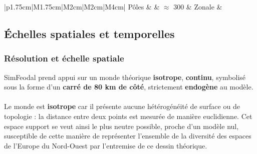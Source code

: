 \begin{table}[H]
{\begin{tabular}{|p{1.75cm}|M{1.75cm}|M{2cm}|M{2cm}|M{4cm}|}
		Pôles &  & $\approx$ 300 & Zonale &  \\ \hline
		\end{tabular}}
	\caption{Les différents types d'agents de SimFeodal.\\
	$\upalpha$ : Il s'agit ici d'ordres de grandeur (les nombres pouvant varier fortement en fonction des simulations) du nombre d'agents de chaque type en fin de simulation.\\
	$\upbeta$ : Les agents sans emprise spatiale (---) ne sont pas localisés dans l'espace du modèle.\\
	$\upgamma$ : Les agents sans comportement actifs (---) n'agissent pas en tant que tel, mais peuvent servir de support pour les actions d'autres agents.}
	\label{tab:agents-simfeodal}
		\end{table}

\subsection{Échelles spatiales et temporelles}

\subsubsection{Résolution et échelle spatiale \label{subsec:reso-spatiale}}

SimFeodal prend appui sur un monde théorique \textbf{isotrope}, \textbf{continu}, symbolisé sous la forme d'un \textbf{carré de 80 km de côté}, strictement \textbf{endogène} au modèle.

\paragraph[Isotrope]{} Le monde est \textbf{isotrope} car il présente aucune hétérogénéité de surface ou de topologie : la distance entre deux points est mesurée de manière euclidienne.
Cet espace support se veut ainsi le plus neutre possible, proche d'un \og modèle nul\fg{}, susceptible de cette manière de représenter l'ensemble de la diversité des espaces de l'Europe du Nord-Ouest par l'entremise de ce dessin théorique.

